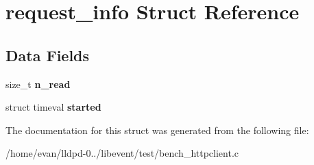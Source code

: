 \section{request\-\_\-info \-Struct \-Reference}
\label{structrequest__info}
\subsection*{\-Data \-Fields}
\begin{DoxyCompactItemize}
\item 
size\-\_\-t {\bfseries n\-\_\-read}\label{structrequest__info_a5a0986a06689880ddec11e93c39660a9}

\item 
struct timeval {\bfseries started}\label{structrequest__info_aabde54c0f94fa44eccecebd0cec3da0f}

\end{DoxyCompactItemize}


\-The documentation for this struct was generated from the following file\-:\begin{DoxyCompactItemize}
\item 
/home/evan/lldpd-\/0../libevent/test/bench\-\_\-httpclient.\-c\end{DoxyCompactItemize}
